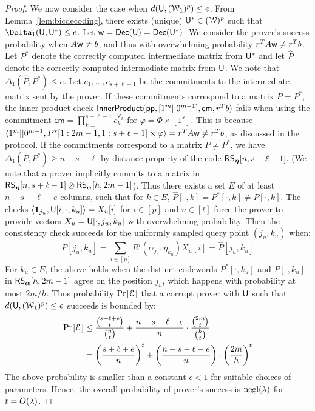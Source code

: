 \begin{proof}
	We now consider the case when $d(\mathsf{U},(\mathcal{W}_1)^p)\leq e$. From Lemma~\ref{lem:bicdecoding}, there exists (unique) $\mathsf{U}^*\in (\mathcal{W})^p$ such that $\Delta_1(\ewit,\ewit^*)\leq e$.
	Let $\mathsf{w}=\mathsf{Dec}(\mathsf{U})=\mathsf{Dec}(\mathsf{U}^*)$. We consider the prover's success probability when $A\mathsf{w}\neq b$, and thus with overwhelming probability $r^TA \mathsf{w} \neq r^Tb$. Let $P^*$ denote the correctly computed intermediate matrix from $\mathsf{U}^*$ and let $\hat{P}$ denote the correctly computed intermediate matrix from $\mathsf{U}$. We note that	$\Delta_1(\hat{P},P^*)\leq e$. Let $c_1,\ldots,c_{s+\ell-1}$ be the commitments to the intermediate matrix sent by the prover. If these commitments correspond to a matrix $P=P^*$, the inner product check $\mathsf{InnerProduct}(\mathsf{pp},[1^m||0^{m-1}],\mathsf{cm},r^Tb)$ fails when using the commitment $\mathsf{cm} = \prod_{k=1}^{s+\ell-1} c_k^{\varphi_k}$ for $\varphi = \Phi \times [1^s]$. This is because $\langle 1^m||0^{m-1},P^*[1:2m-1,1:s+\ell-1]\times \varphi\rangle=r^TA\mathsf{w}\neq r^Tb$, as discussed in the protocol. If the commitments correspond  to a matrix $P\neq P^*$, we have $\Delta_1(P,P^*)\geq n-s-\ell$ by distance property of the code $\mathsf{RS}_{\bm{\eta}}[n, s+\ell-1]$. (We note that a prover implicitly commits to a matrix in $\mathsf{RS}_{\bm{\eta}}[n,s+\ell-1]\otimes \mathsf{RS}_{\bm{\alpha}}[h,2m-1]$). Thus there exists a set $E$ of at least $n-s-\ell-e$ columns, such that for $k\in E$, $\hat{P}[\cdot,k]=P^*[\cdot,k]\neq P[\cdot,k]$. The checks $\langle \bm{1}_{j_u},\mathsf{U}[i,\cdot,k_u]\rangle=X_u[i]$ for $i\in [p]$ and $u\in [t]$ force the prover to provide vectors $X_u=\mathsf{U}[\cdot,j_u,k_u]$ with overwhelming probability. Then the consistency check succeeds for the uniformly sampled query point $(j_u,k_u)$ when:
	\[ P[j_u,k_u] = \sum_{i\in [p]}R^i(\alpha_{j_u},\eta_{k_u})X_u[i] =	\hat{P}[j_u,k_u] \]
	For $k_u\in E$, the above holds when the distinct codewords $P^*[\cdot,k_u]$ and $P[\cdot,k_u]$ in $\mathsf{RS}_{\bm{\alpha}}[h,2m-1]$ agree on the position $j_u$, which happens with 
	probability at most $2m/h$. Thus probability $\prob{\mc{E}}$ that a corrupt prover with $\mathsf{U}$ such that $d(\mathsf{U}, (\mathcal{W}_1)^p) \leq e$ succeeds is bounded by:
	\begin{align*}
	\prob{\mc{E}} &\leq \frac{\binom{s+\ell+e}{t}}{\binom{n}{t}} + \frac{{n-s-\ell-e}}{{n}} \cdot \frac{\binom{2m}{t}}{\binom{h}{t}}\\
	&= \left(\frac{s+\ell+e}{n}\right)^t + \left(\frac{n-s-\ell-e}{n}\right) \cdot \left(\frac{2m}{h}\right)^t
	\end{align*}
	The above probability is smaller than a constant $\epsilon < 1$ for suitable choices of parameters. Hence, the overall probability of prover's success is $\mathrm{negl}(\lambda)$ for $t=O(\lambda)$.
	

\end{proof}
